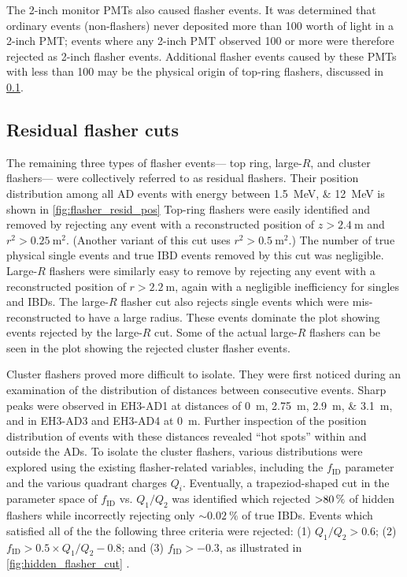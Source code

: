 The 2-inch monitor PMTs also caused flasher events.
It was determined that ordinary events (non-flashers)
never deposited more than \SI{100}{\pe} worth of light
in a 2-inch PMT;
events where any 2-inch PMT observed \SI{100}{\pe} or more
were therefore rejected as 2-inch flasher events.
Additional flasher events caused by these PMTs with less than \SI{100}{\pe}
may be the physical origin of top-ring flashers,
discussed in \cref{subsec:flash_resid}.

\subsection{Residual flasher cuts}
\label{subsec:flash_resid}

The remaining three types of flasher events---%
top ring, large-$R$, and cluster flashers---%
were collectively referred to as residual flashers.
Their position distribution among all AD events
with energy between \SIlist{1.5;12}{\MeV}
is shown in \cref{fig:flasher_resid_pos}
Top-ring flashers were easily identified and removed
by rejecting any event with a reconstructed position
of $z > \SI{2.4}{\m}$ and $r^2 > \SI{0.25}{\m\squared}$.
(Another variant of this cut uses $r^2 > \SI{0.5}{\m\squared}$.)
The number of true physical single events and
true IBD events removed by this cut was negligible.
Large-$R$ flashers were similarly easy to remove
by rejecting any event with a reconstructed position
of $r > \SI{2.2}{\m}$,
again with a negligible inefficiency for singles and IBDs.
The large-$R$ flasher cut also rejects
single events which were mis-reconstructed to have a large radius.
These events dominate the plot showing events rejected by the large-$R$ cut.
Some of the actual large-$R$ flashers can be seen in the plot
showing the rejected cluster flasher events.

Cluster flashers proved more difficult to isolate.
They were first noticed during an examination of the distribution of distances
between consecutive events.
Sharp peaks were observed in EH3-AD1 at distances of \SIlist{0;2.75;2.9;3.1}{\m},
and in EH3-AD3 and EH3-AD4 at \SI{0}{\m}.
Further inspection of the position distribution of events with these distances
revealed ``hot spots'' within and outside the ADs.
To isolate the cluster flashers,
various distributions were explored using the existing flasher-related variables,
including the $f_{\text{ID}}$ parameter and the various quadrant charges $Q_i$.
Eventually, a trapeziod-shaped cut in the parameter space of
$f_{\text{ID}}$ vs. $Q_1/Q_2$ was identified which rejected
$\SI{>80}{\percent}$ of hidden flashers while incorrectly rejecting only
$\sim\SI{0.02}{\percent}$ of true IBDs.
Events which satisfied all of the the following three criteria were rejected:
(1) $Q_1/Q_2 > 0.6$; (2) $f_{\text{ID}} > 0.5 \times Q_1/Q_2 - 0.8$;
and (3) $f_{\text{ID}} > -0.3$,
as illustrated in \cref{fig:hidden_flasher_cut}
\cite{flashers_jinjing,beda_resid_flasher_dt}.


